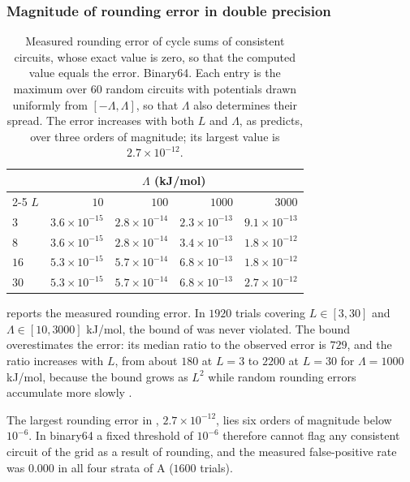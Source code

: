 \documentclass[11pt,a4paper]{article}
\theoremstyle{pstyle}
\theoremstyle{definition}
\theoremstyle{remark}
\begin{document}
\subsubsection{Magnitude of rounding error in double precision}

\begin{table}[t]
\centering\small
\caption{Measured rounding error of cycle sums of consistent circuits,
whose exact value is zero, so that the computed value equals the error.
Binary64. Each entry is the maximum over $60$ random circuits with
potentials drawn uniformly from $[-\Lambda,\Lambda]$, so that $\Lambda$
also determines their spread. The error increases with both $L$ and
$\Lambda$, as  predicts, over three orders of
magnitude; its largest value is $2.7\times10^{-12}$.}
\label{tab:v1}
\begin{tabular}{@{}lrrrr@{}}
\toprule
& \multicolumn{4}{c}{$\Lambda$ (kJ/mol)}\\
\cmidrule(l){2-5}
$L$ & $10$ & $100$ & $1000$ & $3000$\\
\midrule
$3$  & $3.6\times10^{-15}$ & $2.8\times10^{-14}$ & $2.3\times10^{-13}$ & $9.1\times10^{-13}$\\
$8$  & $3.6\times10^{-15}$ & $2.8\times10^{-14}$ & $3.4\times10^{-13}$ & $1.8\times10^{-12}$\\
$16$ & $5.3\times10^{-15}$ & $5.7\times10^{-14}$ & $6.8\times10^{-13}$ & $1.8\times10^{-12}$\\
$30$ & $5.3\times10^{-15}$ & $5.7\times10^{-14}$ & $6.8\times10^{-13}$ & $2.7\times10^{-12}$\\
\bottomrule
\end{tabular}
\end{table}

 reports the measured rounding error. In $1920$ trials
covering $L\in[3,30]$ and $\Lambda\in[10,3000]$ kJ/mol, the bound of
 was never violated. The bound overestimates the
error: its median ratio to the observed error is $729$, and the ratio
increases with $L$, from about $180$ at $L=3$ to $2200$ at $L=30$ for
$\Lambda=1000$ kJ/mol, because the bound grows as $L^{2}$ while random
rounding errors accumulate more slowly \citep{higham2002}.

The largest rounding error in , $2.7\times10^{-12}$, lies
six orders of magnitude below $10^{-6}$. In binary64 a fixed threshold
of $10^{-6}$ therefore cannot flag any consistent circuit of the grid as
a result of rounding, and the measured false-positive rate was $0.000$
in all four strata of A ($1600$ trials).
\end{document}

